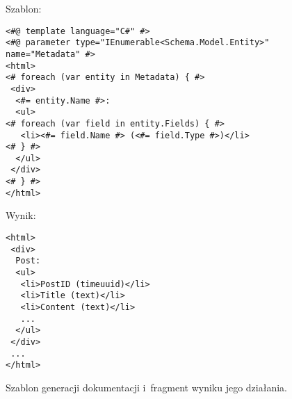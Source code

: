 \begin{figure}[!ht]
Szablon:

\begin{verbatim}
<#@ template language="C#" #>
<#@ parameter type="IEnumerable<Schema.Model.Entity>" name="Metadata" #>
<html>
<# foreach (var entity in Metadata) { #>
 <div>
  <#= entity.Name #>:
  <ul>
<# foreach (var field in entity.Fields) { #>
   <li><#= field.Name #> (<#= field.Type #>)</li>
<# } #>
  </ul>
 </div>
<# } #>
</html>
\end{verbatim}

Wynik:

\begin{verbatim}
<html>
 <div>
  Post:
  <ul>
   <li>PostID (timeuuid)</li>
   <li>Title (text)</li>
   <li>Content (text)</li>
   ...
  </ul>
 </div>
 ...
</html>
\end{verbatim}

\caption{Szablon generacji dokumentacji i~fragment wyniku jego działania.}
\label{fig:single:template_docs}
\end{figure}

